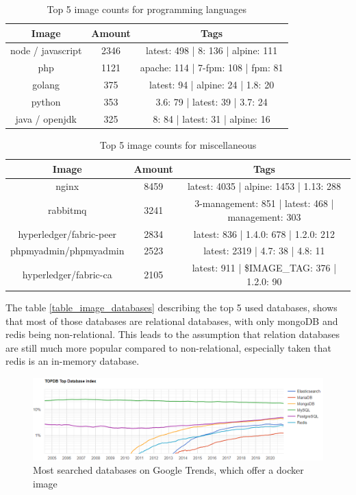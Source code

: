 \begin{table}[h!]
    \centering
    \begin{tabular}{ |c|c|c| }
    \hline
    Image & Amount & Tags \\
    \hline
         node / javascript & 2346 & latest: 498 | 8: 136 | alpine: 111\\
         php & 1121 & apache: 114 | 7-fpm: 108 | fpm: 81 \\
         golang & 375 & latest: 94 | alpine: 24 | 1.8: 20 \\
         python & 353 & 3.6: 79 | latest: 39 | 3.7: 24\\
         java / openjdk & 325 & 8: 84 | latest: 31 | alpine: 16\\
    \hline
    \end{tabular}
    \caption{Top 5 image counts for programming languages}
    \label{table_image_languages}
\end{table}

\begin{table}[h!]
    \centering
    \begin{tabular}{ |c|c|c| }
    \hline
    Image & Amount & Tags \\
    \hline
         nginx & 8459 & latest: 4035 | alpine: 1453 | 1.13: 288\\
         rabbitmq & 3241 & 3-management: 851 | latest: 468 | management: 303\\
         hyperledger/fabric-peer & 2834 & latest: 836 | 1.4.0: 678 | 1.2.0: 212\\
         phpmyadmin/phpmyadmin & 2523 & latest: 2319 | 4.7: 38 | 4.8: 11 \\
         hyperledger/fabric-ca & 2105 & latest: 911 | \$IMAGE\_TAG: 376 | 1.2.0: 90\\
    \hline
    \end{tabular}
    \caption{Top 5 image counts for miscellaneous}
    \label{table_image_misc}
\end{table}

The table \ref{table_image_databases} describing the top 5 used databases, shows that most of those databases are relational databases, with only mongoDB and redis being non-relational. This leads to the assumption that relation databases are still much more popular compared to non-relational, especially taken that redis is an in-memory database.

\begin{figure}[H]
    \centering
    \includegraphics[scale=0.5]{graphics/databases_top_popularity_ranking.png}
    \caption{Most searched databases on Google Trends, which offer a docker image}
    \label{fig:databases_top_ranking}
\end{figure}

